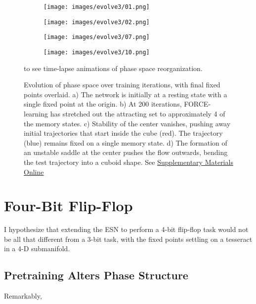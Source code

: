 \documentclass{article} %
\begin{document}
\begin{figure}
\centering
\begin{subfigure}{.5\textwidth}
  \centering
  \texttt{[image: images/evolve3/01.png]}
  \caption{}
\end{subfigure}%
\begin{subfigure}{.5\textwidth}
  \centering
  \texttt{[image: images/evolve3/02.png]}
  \caption{}
\end{subfigure}
\begin{subfigure}{.5\textwidth}
  \centering
  \texttt{[image: images/evolve3/07.png]}
  \caption{}
\end{subfigure}%
\begin{subfigure}{.5\textwidth}
  \centering
  \texttt{[image: images/evolve3/10.png]}
  \caption{}
\end{subfigure}
\caption{Evolution of phase space over training iterations, with final fixed points overlaid. a) The network is initially at a resting state with a single fixed point at the origin. b) At 200 iterations, FORCE-learning has stretched out the attracting set to approximately 4 of the memory states. c) Stability of the center vanishes, pushing away initial trajectories that start inside the cube (red). The trajectory (blue) remains fixed on a single memory state. d) The formation of an unstable saddle at the center pushes the flow outwards, bending the test trajectory into a cuboid shape. See \href{https://github.com/ericjang/ghosts}{Supplementary Materials Online}} to see time-lapse animations of phase space reorganization.
\label{fig:test}
\end{figure}

\section{Four-Bit Flip-Flop}

I hypothesize that extending the ESN to perform a 4-bit flip-flop task would not be all that different from a 3-bit task, with the fixed points settling on a tesseract in a 4-D submanifold.



\subsection{Pretraining Alters Phase Structure}

Remarkably,
\end{document}
